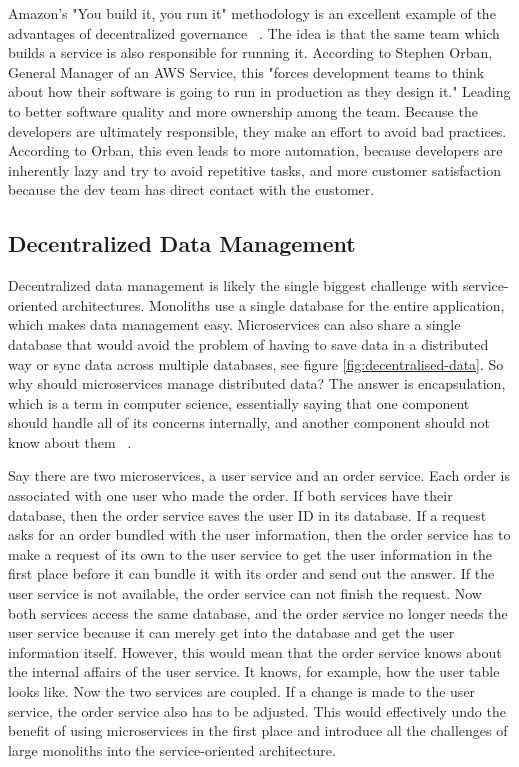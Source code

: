 Amazon's "You build it, you run it" methodology is an excellent example of the advantages of decentralized governance ~\cite{amazon.2015}. The idea is that the same team which builds a service is also responsible for running it. According to Stephen Orban, General Manager of an AWS Service, this "forces development teams to think about how their software is going to run in production as they design it." Leading to better software quality and more ownership among the team. Because the developers are ultimately responsible,  they make an effort to avoid bad practices. According to Orban, this even leads to more automation, because developers are inherently lazy and try to avoid repetitive tasks, and more customer satisfaction because the dev team has direct contact with the customer.


\subsection{Decentralized Data Management}

Decentralized data management is likely the single biggest challenge with service-oriented architectures. Monoliths use a single database for the entire application, which makes data management easy. Microservices can also share a single database that would avoid the problem of having to save data in a distributed way or sync data across multiple databases, see figure \ref{fig:decentralised-data}. So why should microservices manage distributed data? The answer is encapsulation, which is a term in computer science, essentially saying that one component should handle all of its concerns internally, and another component should not know about them ~\cite{krivtsov.2019}.

Say there are two microservices, a user service and an order service. Each order is associated with one user who made the order. If both services have their database, then the order service saves the user ID in its database. If a request asks for an order bundled with the user information, then the order service has to make a request of its own to the user service to get the user information in the first place before it can bundle it with its order and send out the answer. If the user service is not available, the order service can not finish the request. Now both services access the same database, and the order service no longer needs the user service because it can merely get into the database and get the user information itself. However, this would mean that the order service knows about the internal affairs of the user service. It knows, for example, how the user table looks like. Now the two services are coupled. If a change is made to the user service, the order service also has to be adjusted. This would effectively undo the benefit of using microservices in the first place and introduce all the challenges of large monoliths into the service-oriented architecture.

